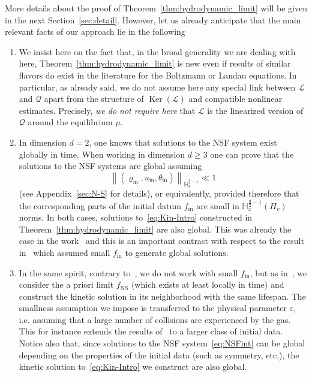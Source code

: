 \documentclass[10pt]{amsart}
\theoremstyle{definition}\newtheorem{defi}[theo]{Definition}\newtheorem{rema}[theo]{Remark}\newtheorem{exam}[theo]{Example}\newtheorem{exem}[theo]{Example}\newtheorem{nota}[theo]{Notation}
\DeclareMathOperator{\nul}{Ker}
\newcommand{\ini}{\mathrm{in}}
\newcommand{\ns}{\mathrm{NS}}
\newcommand{\bbH}{\mathbb{H}}
\newcommand{\LL}{\mathcal{L}}
\newcommand{\QQ}{\mathcal{Q}}
\newcommand{\Ss}{H}
\renewcommand*\ge{\geqslant}
\newcommand*\eps{{\varepsilon}}
\newcommand*{\relabel}{\renewcommand{\labelenumi}{(\theenumi)}}
\newcommand*{\romanenumi}{\renewcommand*{\theenumi}{\roman{enumi}}\relabel}
\begin{document}
More details about the proof of Theorem~\ref{thm:hydrodynamic_limit} will be given in the next Section~\ref{sec:detail}. However, let us already anticipate that the main relevant facts of our approach lie in the following
\begin{enumerate}\romanenumi
\item We insist here on the fact that, in the broad generality we are dealing with here, Theorem~\ref{thm:hydrodynamic_limit} is new even if results of similar flavors do exist in the literature for the Boltzmann or Landau equations. In particular, as already said, we do not assume here any special link between $\LL$ and $\QQ$ apart from the structure of $\nul(\LL)$ and compatible nonlinear estimates. Precisely, \emph{we do not require here} that $\LL$ is the linearized version of $\QQ$ around the equilibrium $\mu$.

\item In dimension $d=2$, one knows that solutions to the NSF system exist globally in time. When working in dimension $d\ge 3$ one can prove that the solutions to the NSF systems are global assuming
\[
\left\|(\varrho_\ini,u_\ini,\theta_\ini)\right\|_{\bbH^{\frac{d}{2}-1}_x} \ll 1
\]
(see Appendix~\ref{sec:N-S} for details), or equivalently, provided therefore that {the corresponding parts of the initial datum $f_\ini$ are small in $\bbH^{\frac{d}{2}-1}_{x}(\Ss_v)$ norms.} In both cases, solutions to~\eqref{eq:Kin-Intro} constructed in Theorem~\ref{thm:hydrodynamic_limit} are also global. This was already the case in the work~\cite{GT2020} and this is an important contrast with respect to the result in~\cite{BU1991} which assumed small $f_{\ini}$ to generate global solutions.

\item In the same spirit, contrary to~\cite{BU1991, CC2023,CRT2022}, we do not work with small $f_\ini$, but as in~\cite{G2023,GT2020}, we consider the a priori limit $f_{\ns}$ (which exists at least locally in time) and construct the kinetic solution in its neighborhood with the same lifespan. The smallness assumption we impose is transferred to the physical parameter $\eps$, i.e. assuming that a large number of collisions are experienced by the gas. This for instance extends the results of~\cite{CC2023,CRT2022} to a larger class of initial data. Notice also that, since solutions to the NSF system~\eqref{eq:NSFint} can be global depending on the properties of the initial data (such as {symmetry, etc.}), the kinetic solution to~\eqref{eq:Kin-Intro} we construct are also global.


\end{enumerate}
\end{document}
